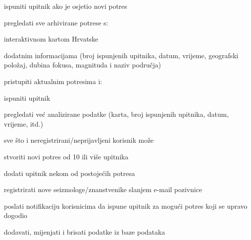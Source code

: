 			
			\begin{packed_enum}
				\item  {}
				
				\begin{packed_enum}
					
					\item ispuniti upitnik ako je osjetio novi potres
					\item pregledati sve arhivirane potrese s:
					\begin{packed_enum}
						\item interaktivnom kartom Hrvatske 
						\item dodatnim informacijama (broj ispunjenih upitnika, datum, vrijeme, geografski položaj, dubina fokusa, magnituda i naziv područja)
					\end{packed_enum}
					\item pristupiti aktualnim potresima i:
					\begin{packed_enum}
						\item ispuniti upitnik
						\item pregledati već analizirane podatke (karta, broj ispunjenih upitnika, datum, vrijeme, itd.)
					\end{packed_enum}
					
				\end{packed_enum}
			
				\item  \underbar{Administrator može:}
				
				\begin{packed_enum}
					\item sve što i neregistrirani/neprijavljeni korisnik može
					\item stvoriti novi potres od 10 ili više upitnika
					\begin{packed_enum}
						\item dodati upitnik nekom od postojećih potresa
					\end{packed_enum}
					\item registrirati nove seizmologe/znanstvenike slanjem e-mail pozivnice
					\item poslati notifikaciju korisnicima da ispune upitnik za mogući potres koji se upravo dogodio
					\item dodavati, mijenjati i brisati podatke iz baze podataka
					
				\end{packed_enum}
			\end{packed_enum}
			
